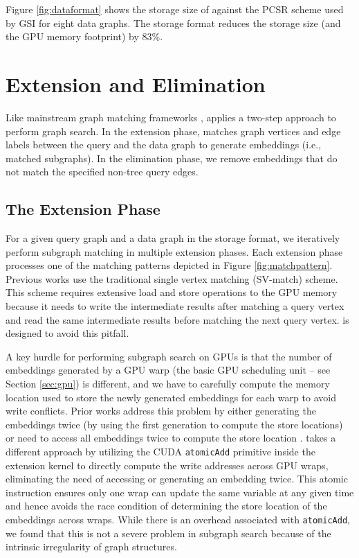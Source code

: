 Figure \ref{fig:dataformat} shows the storage size of \SystemName against the PCSR scheme used by GSI for eight data graphs. The \SystemName storage
format reduces the storage size (and the GPU memory footprint) by 83\%.

\section{Extension and Elimination\label{sec:extensionphase}}
Like mainstream graph matching frameworks \cite{tran2015fast, zeng2020gsi}, \SystemName applies a two-step approach to perform graph
search. In the extension phase, \SystemName matches graph vertices and edge labels between the query and the data graph to generate embeddings (i.e., matched subgraphs). In the elimination phase, we remove embeddings that do not match the specified non-tree query edges.


\subsection{The Extension Phase}

For a given query graph and a data graph in the \SystemName storage format, we iteratively perform subgraph matching in multiple extension
phases. Each extension phase processes one of the matching patterns depicted in Figure \ref {fig:matchpattern}. Previous works
\cite{zeng2020gsi,sun2020subgraph} use the traditional single vertex matching (SV-match) scheme. This scheme requires extensive load and
store operations to the GPU memory because it needs to write the intermediate results after matching a query vertex and read the same
intermediate results before matching the next query vertex. \SystemName is designed to avoid this pitfall.


A key hurdle for performing subgraph search on GPUs is that the number of embeddings generated by a GPU warp (the basic GPU scheduling
unit – see Section \ref {sec:gpu}) is different, and we have to carefully compute the memory location used to store the newly generated
embeddings for each warp to avoid write conflicts. Prior works address this problem by either generating the embeddings twice (by using the
first generation to compute the store locations) \cite{tran2015fast} or need to access all embeddings twice to compute the store location
\cite{zeng2020gsi}. \SystemName takes a different approach by utilizing the CUDA \texttt{atomicAdd} primitive inside the extension kernel
to directly compute the write addresses across GPU wraps, eliminating the need of accessing or generating an embedding twice. This
atomic instruction ensures only one wrap can update the same variable at any given time and hence avoids the race condition of determining
the store location of the embeddings across wraps. While there is an overhead associated with \texttt{atomicAdd}, we found that this is not
a severe problem in subgraph search because of the intrinsic irregularity of graph structures.


